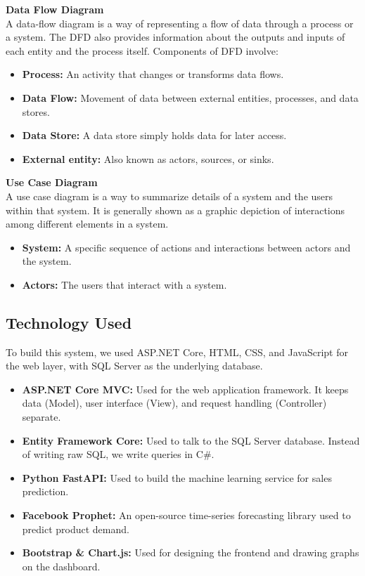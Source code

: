 \documentclass[12pt,a4paper]{report}
\begin{document}
\textbf{Data Flow Diagram}\\
A data-flow diagram is a way of representing a flow of data through a process or a system. The DFD also provides information about the outputs and inputs of each entity and the process itself. Components of DFD involve:
\begin{itemize}
    \item \textbf{Process:} An activity that changes or transforms data flows.
    \item \textbf{Data Flow:} Movement of data between external entities, processes, and data stores.
    \item \textbf{Data Store:} A data store simply holds data for later access.
    \item \textbf{External entity:} Also known as actors, sources, or sinks.
\end{itemize}

\textbf{Use Case Diagram}\\
A use case diagram is a way to summarize details of a system and the users within that system. It is generally shown as a graphic depiction of interactions among different elements in a system. 
\begin{itemize}
    \item \textbf{System:} A specific sequence of actions and interactions between actors and the system.
    \item \textbf{Actors:} The users that interact with a system.
\end{itemize}

\subsection{Technology Used}
To build this system, we used ASP.NET Core, HTML, CSS, and JavaScript for the web layer, with SQL Server as the underlying database.
\begin{itemize}
    \item \textbf{ASP.NET Core MVC:} Used for the web application framework. It keeps data (Model), user interface (View), and request handling (Controller) separate.
    \item \textbf{Entity Framework Core:} Used to talk to the SQL Server database. Instead of writing raw SQL, we write queries in C\#.
    \item \textbf{Python FastAPI:} Used to build the machine learning service for sales prediction.
    \item \textbf{Facebook Prophet:} An open-source time-series forecasting library used to predict product demand.
    \item \textbf{Bootstrap \& Chart.js:} Used for designing the frontend and drawing graphs on the dashboard.
\end{itemize}
\end{document}
